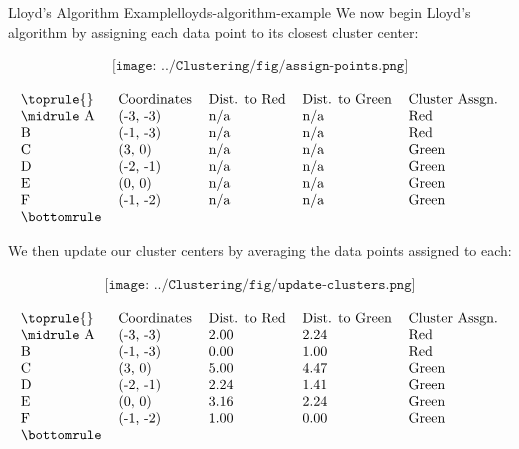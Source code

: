 \begin{example}{Lloyd's Algorithm Example}{lloyds-algorithm-example}
	We now begin Lloyd's algorithm by assigning each data point to its closest cluster center:

	\begin{align*}
		\texttt{[image: ../Clustering/fig/assign-points.png]}
	\end{align*}

	\begin{align*}
	\begin{tabular}{lllll}
	\toprule
	{} & Coordinates & Dist. to Red & Dist. to Green & Cluster Assgn. \\
	\midrule
	A &    (-3, -3) &         n/a &            n/a &              Red \\
	B &    (-1, -3) &         n/a &            n/a &              Red \\
	C &      (3, 0) &         n/a &            n/a &            Green \\
	D &    (-2, -1) &         n/a &            n/a &            Green \\
	E &      (0, 0) &         n/a &            n/a &            Green \\
	F &    (-1, -2) &         n/a &            n/a &            Green \\
	\bottomrule
	\end{tabular}
	\end{align*} \newline

	We then update our cluster centers by averaging the data points assigned to each:

	\begin{align*}
		\texttt{[image: ../Clustering/fig/update-clusters.png]}
	\end{align*}

	\begin{align*}
	\begin{tabular}{lllll}
	\toprule
	{} & Coordinates & Dist. to Red & Dist. to Green & Cluster Assgn. \\
	\midrule
	A &    (-3, -3) &         2.00 &           2.24 &            Red \\
	B &    (-1, -3) &         0.00 &           1.00 &            Red \\
	C &      (3, 0) &         5.00 &           4.47 &          Green \\
	D &    (-2, -1) &         2.24 &           1.41 &          Green \\
	E &      (0, 0) &         3.16 &           2.24 &          Green \\
	F &    (-1, -2) &         1.00 &           0.00 &          Green \\
	\bottomrule
	\end{tabular}
	\end{align*}


\end{example}
